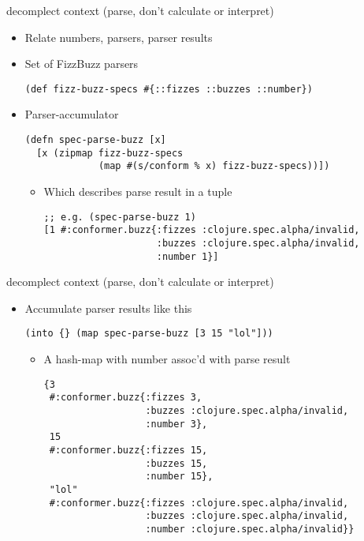 \documentclass[presentation]{beamer}
\begin{document}
\begin{frame}[label={sec:orgda6109e},fragile]{decomplect context (parse, don't calculate or interpret)}
 \begin{itemize}
\item Relate numbers, parsers, parser results
\item Set of FizzBuzz parsers
\begin{verbatim}
(def fizz-buzz-specs #{::fizzes ::buzzes ::number})
\end{verbatim}
\item Parser-accumulator
\begin{verbatim}
(defn spec-parse-buzz [x]
  [x (zipmap fizz-buzz-specs
             (map #(s/conform % x) fizz-buzz-specs))])
\end{verbatim}
\begin{itemize}
\item Which describes parse result in a tuple
\begin{verbatim}
;; e.g. (spec-parse-buzz 1)
[1 #:conformer.buzz{:fizzes :clojure.spec.alpha/invalid,
                    :buzzes :clojure.spec.alpha/invalid,
                    :number 1}]
\end{verbatim}
\end{itemize}
\end{itemize}
\end{frame}
\begin{frame}[label={sec:org0f15e6c},fragile]{decomplect context (parse, don't calculate or interpret)}
 \begin{itemize}
\item Accumulate parser results like this
\begin{verbatim}
(into {} (map spec-parse-buzz [3 15 "lol"]))
\end{verbatim}
\begin{itemize}
\item A hash-map with number assoc'd with parse result
\begin{verbatim}
{3
 #:conformer.buzz{:fizzes 3,
                  :buzzes :clojure.spec.alpha/invalid,
                  :number 3},
 15
 #:conformer.buzz{:fizzes 15,
                  :buzzes 15,
                  :number 15},
 "lol"
 #:conformer.buzz{:fizzes :clojure.spec.alpha/invalid,
                  :buzzes :clojure.spec.alpha/invalid,
                  :number :clojure.spec.alpha/invalid}}
\end{verbatim}
\end{itemize}
\end{itemize}
\end{frame}
\end{document}

